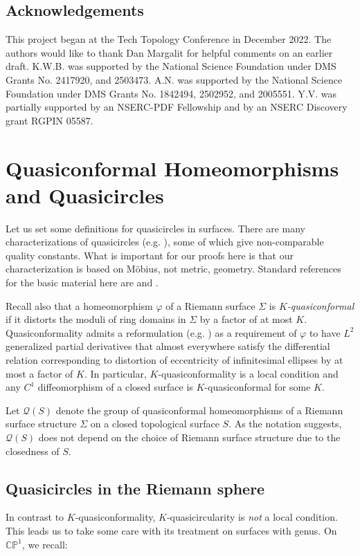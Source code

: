 \documentclass[12pt,a4paper]{amsart}
\newcommand{\CP}{\mathbb{CP}}
\theoremstyle{definition}
\theoremstyle{plain}
\numberwithin{equation}{section}
\begin{document}
\subsection*{Acknowledgements}
This project began at the Tech Topology Conference in December 2022. The authors would like to thank Dan Margalit for helpful comments on an earlier draft.
K.W.B. was supported by the National Science Foundation under DMS Grants No. 2417920, and 2503473.
A.N. was supported by the National Science Foundation under DMS Grants No. 1842494, 2502952, and 2005551.
Y.V. was partially supported by an NSERC-PDF Fellowship and by an NSERC Discovery grant RGPIN 05587.


\section{Quasiconformal Homeomorphisms and Quasicircles}\label{s-qcbasics} 

Let us set some definitions for quasicircles in surfaces. 
There are many characterizations of quasicircles (e.g. \cite{gehring1999characterizations}), some of which give non-comparable quality constants.
What is important for our proofs here is that our characterization is based on M\"obius, not metric, geometry.
Standard references for the basic material here are \cite{lehto1973quasiconformal} and \cite{lehto2012univalent}.


Recall also that a homeomorphism $\varphi$ of a Riemann surface $\Sigma$ is \textit{$K$-quasiconformal} if it distorts the moduli of ring domains in $\Sigma$ by a factor of at most $K$.
Quasiconformality admits a reformulation (e.g. \cite{bers1960quasiconformal}) as a requirement of $\varphi$ to have $L^2$ generalized partial derivatives that almost everywhere satisfy the differential relation corresponding to distortion of eccentricity of infinitesimal ellipses by at most a factor of $K$.
In particular, $K$-quasiconformality is a local condition and any $C^1$ diffeomorphism of a closed surface is $K$-quasiconformal for some $K$.

Let $\mathcal{Q}(S)$ denote the group of quasiconformal homeomorphisms of a Riemann surface structure $\Sigma$ on a closed topological surface $S$.
As the notation suggests, $\mathcal{Q}(S)$ does not depend on the choice of Riemann surface structure due to the closedness of $S$. 

\subsection{Quasicircles in the Riemann sphere} In contrast to $K$-quasiconformality, $K$-quasicircularity is \textit{not} a local condition. 
This leads us to take some care with its treatment on surfaces with genus.
On $\CP^1$, we recall:
\end{document}
